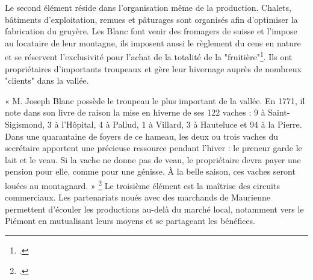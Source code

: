 \documentclass[12pt,a4paper]{report}
\begin{document}
	Le second élément réside dans l'organisation même de la production. Chalets, bâtiments d'exploitation, remues et pâturages sont organisés afin d'optimiser la fabrication du gruyère. Les Blanc font venir des fromagers de suisse et l'impose au locataire de leur montagne, ils imposent aussi le règlement  du cens en nature et se réservent l'exclusivité pour l'achat de la totalité de la "fruitière"\footcite[262]{Viallet1990Blanc}. Ils ont propriétaires d'importants troupeaux et gère leur hivernage auprès de nombreux "clients" dans la vallée.
	
	« M. Joseph Blanc possède le troupeau le plus important de la vallée. En 1771, il note dans son livre de raison la mise en hiverne de ses 122 vaches : 9 à Saint-Sigismond, 3 à l'Hôpital, 4 à Pallud, 1 à Villard, 3 à Hauteluce et 94 à la Pierre. Dans une quarantaine de foyers de ce hameau, les deux ou trois vaches du secrétaire apportent une précieuse ressource pendant l'hiver : le preneur garde le lait et le veau. Si la vache ne donne pas de veau, le propriétaire devra payer une pension pour elle, comme pour une génisse. À la belle saison, ces vaches seront louées au montagnard. »
	\footcite[265]{Viallet1990Blanc}
	Le troisième élément est la maîtrise des circuits commerciaux.  Les partenariats noués avec des marchands de Maurienne permettent d'écouler les productions au-delà du marché local, notamment vers le Piémont en mutualisant leurs moyens et se partageant les bénéfices. 
	
\end{document}

